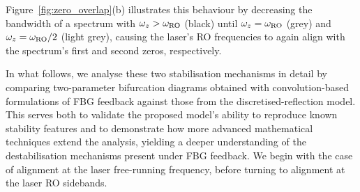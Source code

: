 Figure~\ref{fig:zero_overlap}(b) illustrates this behaviour by decreasing the bandwidth of a spectrum with $\omega_z>\omega_\text{RO}$ (black) until $\omega_z = \omega_\text{RO}$ (grey) and $\omega_z = \omega_\text{RO} / 2$ (light grey), causing the laser's RO frequencies to again align with the spectrum's first and second zeros, respectively.
%
\par
%
In what follows, we analyse these two stabilisation mechanisms in detail by comparing two-parameter bifurcation diagrams obtained with convolution-based formulations of FBG feedback \cite{li2015chaotic,skenderas2024impact} against those from the discretised-reflection model.
This serves both to validate the proposed model’s ability to reproduce known stability features and to demonstrate how more advanced mathematical techniques extend the analysis, yielding a deeper understanding of the destabilisation mechanisms present under FBG feedback.
We begin with the case of alignment at the laser free-running frequency, before turning to alignment at the laser RO sidebands.
%
%
